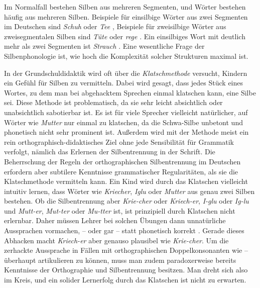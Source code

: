 Im Normalfall bestehen Silben aus mehreren Segmenten, und Wörter bestehen häufig aus mehreren Silben.
Beispiele für einsilbige Wörter aus zwei Segmenten im Deutschen sind \textit{Schuh} \textipa{[Su:]} oder \textit{Tee} \textipa{[te:]}, Beispiele für zweisilbige Wörter aus zweisegmentalen Silben sind \textit{Tüte} \textipa{[ty:t@]} oder \textit{rege} \textipa{[Ke:g@]}.
Ein einsilbiges Wort mit deutlich mehr als zwei Segmenten ist \textit{Strauch} \textipa{[StK\t{aO}X]}.
Eine wesentliche Frage der Silbenphonologie ist, wie hoch die Komplexität solcher Strukturen maximal ist.


In der Grundschuldidaktik wird oft über die \textit{Klatschmethode} versucht, Kindern ein Gefühl für Silben zu vermitteln.
Dabei wird gesagt, dass jedes Stück eines Wortes, zu dem man bei abgehacktem Sprechen einmal klatschen kann, eine Silbe sei.
Diese Methode ist problematisch, da sie sehr leicht absichtlich oder unabsichtlich sabotierbar ist.
Es ist für viele Sprecher vielleicht natürlicher, auf Wörter wie \textit{Mutter} \textipa{[mUt5]} nur einmal zu klatschen, da die Schwa-Silbe unbetont und phonetisch nicht sehr prominent ist.
Außerdem wird mit der Methode meist ein rein orthographisch-didaktisches Ziel ohne jede Sensibilität für Grammatik verfolgt, nämlich das Erlernen der Silbentrennung in der Schrift.
Die Beherrschung der Regeln der orthographischen Silbentrennung im Deutschen erfordern aber subtilere Kenntnisse grammatischer Regularitäten, als sie die Klatschmethode vermitteln kann.
Ein Kind wird durch das Klatschen vielleicht intuitiv lernen, dass Wörter wie \textit{Kriecher}, \textit{Iglu} oder \textit{Mutter} aus genau zwei Silben bestehen.
Ob die Silbentrennung aber \textit{Krie-cher} oder \textit{Kriech-er}, \textit{I-glu} oder \textit{Ig-lu} und \textit{Mutt-er}, \textit{Mut-ter} oder \textit{Mu-tter} ist, ist prinzipiell durch Klatschen nicht erlernbar.
Daher müssen Lehrer bei solchen Übungen dann unnatürliche Aussprachen vormachen, \zB \textipa{[mUt]} -- \textipa{[ta]} oder gar \textipa{[mUt]} -- \textipa{[tEK]} statt phonetisch korrekt \textipa{[mU.t5]}.
Gerade dieses Abhacken macht \textit{Kriech-er} aber genauso plausibel wie \textit{Krie-cher}.
Um die zerhackte Aussprache in Fällen mit orthographischen Doppelkonsonanten wie \textipa{[mUt]} -- \textipa{[ta]} überhaupt artikulieren zu können, muss man zudem paradoxerweise bereits Kenntnisse der Orthographie und Silbentrennung besitzen.
Man dreht sich also im Kreis, und ein solider Lernerfolg durch das Klatschen ist nicht zu erwarten.

